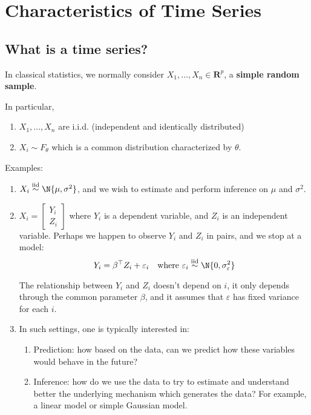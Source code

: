 \chapter{Characteristics of Time Series}
\section{What is a time series?}
In classical statistics, we normally consider $ X_1,\ldots,X_n\in\mathbf{R}^p $,
a \textbf{simple random sample}.

In particular,
\begin{enumerate}[(1)]
    \item $ X_1,\ldots,X_n $ are i.i.d. (independent and identically distributed)
    \item $ X_i \sim F_\theta $ which is a common distribution characterized
          by $ \theta $.
\end{enumerate}
Examples:
\begin{enumerate}
    \item $ X_i \stackrel{\text{iid}}{\sim} \N{\mu,\sigma^2} $, and we wish to estimate
          and perform inference on $ \mu $ and $ \sigma^2 $.
    \item $ X_i=\begin{bmatrix}
                  Y_i \\
                  Z_i
              \end{bmatrix} $ where $ Y_i $ is a dependent variable, and
          $ Z_i $ is an independent variable.
              {\color{blue}Perhaps we happen to observe
                  $ Y_i $ and $ Z_i $ in pairs, and we stop at a model:}
          \[ Y_i=\beta^\top Z_i+\varepsilon_i\quad \text{where }\varepsilon_i
              \stackrel{\text{iid}}{\sim} \N{0,\sigma_\varepsilon^2} \]
          \begin{Remark}{}{}
              The relationship between $ Y_i $ and $ Z_i $ doesn't
              depend on $ i $, it only depends through the common parameter
              $ \beta $, and it assumes that $ \varepsilon $ has fixed variance
              for each $ i $.
          \end{Remark}
    \item In such settings, one is typically interested in:
          \begin{enumerate}
              \item Prediction: {\color{blue}how based on the data, can we predict
                    how these variables would behave in the future?}
              \item Inference: {\color{blue}how do we use the data to try to estimate
                    and understand better the underlying mechanism which generates
                    the data? For example, a linear model or simple Gaussian model.}
          \end{enumerate}
\end{enumerate}
